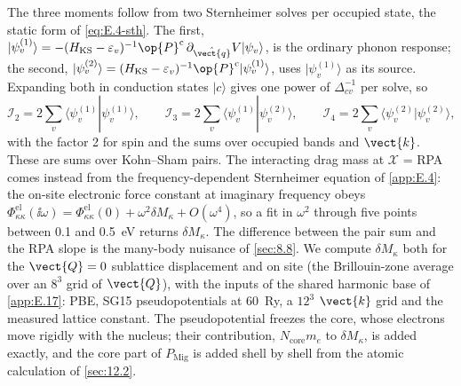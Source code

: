 The three moments follow from two Sternheimer solves per occupied state, the static form of \cref{eq:E.4-sth}. The first, $|\psi^{(1)}_v\rangle = -(H_{\mathrm{KS}} - \varepsilon_v)^{-1}\op{P}^{\mathrm{c}}\,\partial_{\hat{\vect{q}}}V|\psi_v\rangle$, is the ordinary phonon response; the second, $|\psi^{(2)}_v\rangle = (H_{\mathrm{KS}} - \varepsilon_v)^{-1}\op{P}^{\mathrm{c}}|\psi^{(1)}_v\rangle$, uses $|\psi^{(1)}_v\rangle$ as its source. Expanding both in conduction states $|c\rangle$ gives one power of $\Delta_{cv}^{-1}$ per solve, so
\begin{equation}
  \mathcal{I}_2 = 2\sum_v\langle\psi^{(1)}_v|\psi^{(1)}_v\rangle , \qquad
  \mathcal{I}_3 = 2\sum_v\langle\psi^{(1)}_v|\psi^{(2)}_v\rangle , \qquad
  \mathcal{I}_4 = 2\sum_v\langle\psi^{(2)}_v|\psi^{(2)}_v\rangle ,
  \label{eq:E.18-sth}
\end{equation}
with the factor 2 for spin and the sums over occupied bands and $\vect{k}$. These are sums over Kohn--Sham pairs. The interacting drag mass at $\mathcal{X}$ = RPA comes instead from the frequency-dependent Sternheimer equation of \cref{app:E.4}: the on-site electronic force constant at imaginary frequency obeys $\Phi^{\mathrm{el}}_{\kappa\kappa}(\ii\omega) = \Phi^{\mathrm{el}}_{\kappa\kappa}(0) + \omega^2\delta M_\kappa + O(\omega^4)$, so a fit in $\omega^2$ through five points between 0.1 and \SI{0.5}{eV} returns $\delta M_\kappa$. The difference between the pair sum and the RPA slope is the many-body nuisance of \cref{sec:8.8}. We compute $\delta M_\kappa$ both for the $\vect{Q} = 0$ sublattice displacement and on site (the Brillouin-zone average over an $8^3$ grid of $\vect{Q}$), with the inputs of the shared harmonic base of \cref{app:E.17}: PBE, SG15 pseudopotentials at \SI{60}{Ry}, a $12^3$ $\vect{k}$ grid and the measured lattice constant. The pseudopotential freezes the core, whose electrons move rigidly with the nucleus; their contribution, $N_{\mathrm{core}}m_e$ to $\delta M_\kappa$, is added exactly, and the core part of $P_{\mathrm{Mig}}$ is added shell by shell from the atomic calculation of \cref{sec:12.2}.

